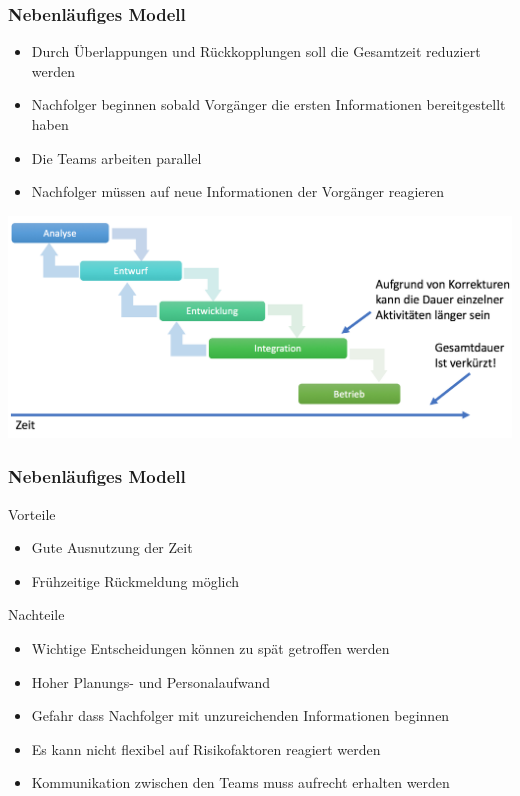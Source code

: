 \begin{frame}
\frametitle{Nebenläufiges Modell}
	\begin{itemize}
		\item Durch Überlappungen und Rückkopplungen
		soll die Gesamtzeit reduziert werden
		\item Nachfolger beginnen sobald Vorgänger die ersten
		Informationen bereitgestellt haben
		\item Die Teams arbeiten parallel
		\item Nachfolger müssen auf neue Informationen der Vorgänger reagieren
	\end{itemize}
	\center\includegraphics[width=1\textwidth,
		keepaspectratio=true]{bilder/nebenlaufiges_model.png}
\end{frame}

\begin{frame}
\frametitle{Nebenläufiges Modell}
	Vorteile
	\begin{itemize}
		\item Gute Ausnutzung der Zeit
		\item Frühzeitige Rückmeldung möglich
	\end{itemize}
	\bigskip
	Nachteile
	\begin{itemize}
		\item Wichtige Entscheidungen können zu spät getroffen werden
		\item Hoher Planungs- und Personalaufwand
		\item Gefahr dass Nachfolger mit unzureichenden Informationen beginnen
		\item Es kann nicht flexibel auf Risikofaktoren reagiert werden
		\item Kommunikation zwischen den Teams muss aufrecht erhalten werden
	\end{itemize}
\end{frame}

